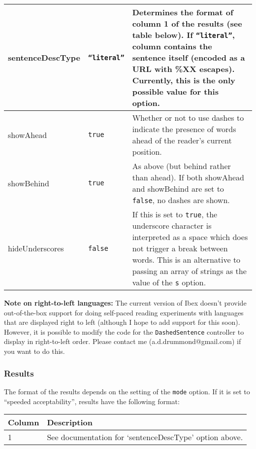 \documentclass[11pt,letterpaper]{article}
\begin{document}
\begin{RaggedRight}
\begin{tabular}{|p{1.0146in}|p{1.0279in}|p{3.4575in}|}
 sentenceDescType  &  \texttt{``literal''}          &  Determines the format of column 1 of the results (see table below). If \texttt{``literal''}, column contains the sentence itself (encoded as a URL with \%XX escapes). Currently, this is the only possible value for this option. \\
\hline
 showAhead      &  \texttt{true}                  &  Whether or not to use dashes to indicate the presence of words ahead of the reader's current position. \\
\hline
 showBehind     &  \texttt{true}                  &  As above (but behind rather than ahead). If both showAhead and showBehind are set to \texttt{false}, no dashes are shown. \\
\hline
 hideUnderscores  &  \texttt{false}               &  If this is set to \texttt{true}, the underscore character is interpreted as a space which does not trigger a break between words. This is an alternative to passing an array of strings as the value of the \texttt{s} option. 
\\\hline
\end{tabular}
\end{RaggedRight}
\fussy

\normalsize

\textbf{Note on right-to-left languages:} The current version of Ibex doesn't provide out-of-the-box support
for doing self-paced reading experiments with languages that are displayed right to left (although
I hope to add support for this soon). However, it
is possible to modify the code for the \texttt{DashedSentence} controller to display in right-to-left order.
Please contact me (a.d.drummond@gmail.com) if you want to do this.

\subsubsection*{Results}

The format of the results depends on the setting of the \texttt{mode} option. If it is
set to ``speeded acceptability'', results have the following format:



\footnotesize
\begin{RaggedRight}
\sloppy
\begin{tabular}{|p{1.2230in}|p{4.2770in}|}
\hline
 \textbf{Column}  &  \textbf{Description} \\
\hline
 1         &  See documentation for `sentenceDescType' option above. 
\\\hline
\end{tabular}
\end{RaggedRight}
\fussy
\end{document}
